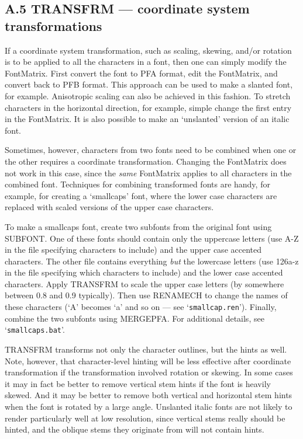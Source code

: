 \subsection{A.5 TRANSFRM --- coordinate system transformations} 

If a coordinate system transformation, such as scaling, skewing, 
and/or rotation is to be applied to all the characters in a font,
then one can simply modify the FontMatrix.  First convert the font to
PFA format, edit the FontMatrix, and convert back to PFB format.
This approach can be used to make a slanted font, for example.
Anisotropic scaling can also be achieved in this fashion.
To stretch characters in the horizontal direction, for example,
simple change the first entry in the FontMatrix.
It is also possible to make an `unslanted' version of an italic font.

Sometimes, however, characters from two fonts need to be combined when one or
the other requires a coordinate transformation.  Changing the FontMatrix does
not work in this case, since the {\it same} FontMatrix applies to all
characters in the combined font.  Techniques for combining transformed
fonts are handy, for example, for creating a `smallcaps' font, where the
lower case characters are replaced with scaled versions of the upper case
characters.

To make a smallcaps font, create two subfonts from the original font
using SUBFONT.
One of these fonts should contain only the uppercase letters
(use A-Z in the file specifying characters to include)
and the upper case accented characters.
The other file contains everything {\it but} the lowercase letters
(use \char126a-z %
in the file specifying which characters to include)
and the lower case accented characters.
Apply TRANSFRM to scale the upper case letters
(by somewhere between 0.8 and 0.9 typically).  
Then use RENAMECH to change the names of these characters 
(`A' becomes `a' and so on --- see `{\tt smallcap.ren}').
Finally, combine the two subfonts using MERGEPFA.
For additional details, see `{\tt smallcaps.bat}'.

TRANSFRM transforms not only the character outlines, but the hints as well.
Note, however, that character-level hinting will be less effective after
coordinate transformation if the transformation involved rotation or skewing.
In some cases it may in fact be better to remove vertical stem hints
if the font is heavily skewed.
And it may be better to remove both vertical and horizontal stem
hints when the font is rotated by a large angle.
Unslanted italic fonts are not likely to render particularly well
at low resolution, since vertical stems really should be hinted,
and the oblique stems they originate from will not contain hints.

